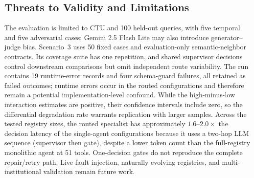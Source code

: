 \subsection{Threats to Validity and Limitations}
\label{sec:limitations}

The evaluation is limited to CTU and 100 held-out queries, with five temporal and five adversarial cases; Gemini 2.5 Flash Lite may also introduce generator--judge bias. Scenario~3 uses 50 fixed cases and evaluation-only semantic-neighbor contracts. Its coverage suite has one repetition, and shared supervisor decisions control downstream comparisons but omit independent route variability. The run contains 19 runtime-error records and four schema-guard failures, all retained as failed outcomes; runtime errors occur in the routed configurations and therefore remain a potential implementation-level confound. While the high-minus-low interaction estimates are positive, their confidence intervals include zero, so the differential degradation rate warrants replication with larger samples. Across the tested registry sizes, the routed specialist has approximately $1.6$--$2.0\times$ the decision latency of the single-agent configurations because it uses a two-hop LLM sequence (supervisor then gate), despite a lower token count than the full-registry monolithic agent at 51 tools. One-decision gates do not reproduce the complete repair/retry path. Live fault injection, naturally evolving registries, and multi-institutional validation remain future work.

